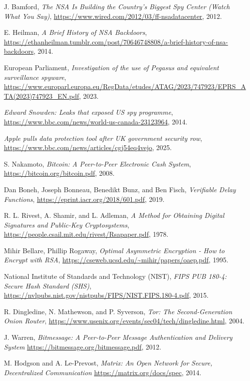 \documentclass{article}
\begin{document}
\begin{thebibliography}{10}
J. Bamford, \textit{The NSA Is Building the Country’s Biggest Spy Center (Watch What You Say)}, 
\url{https://www.wired.com/2012/03/ff-nsadatacenter}, 2012.

E. Heilman, \textit{A Brief History of NSA Backdoors}, 
\url{https://ethanheilman.tumblr.com/post/70646748808/a-brief-history-of-nsa-backdoors}, 2014.

European Parliament, \textit{Investigation of the use of Pegasus and
equivalent surveillance spyware}, 
\url{https://www.europarl.europa.eu/RegData/etudes/ATAG/2023/747923/EPRS_ATA(2023)747923_EN.pdf}, 2023.

\textit{Edward Snowden: Leaks that exposed US spy programme}, 
\url{https://www.bbc.com/news/world-us-canada-23123964}, 2014.

\textit{Apple pulls data protection tool after UK government security row}, 
\url{https://www.bbc.com/news/articles/cgj54eq4vejo}, 2025.

S. Nakamoto, \textit{Bitcoin: A Peer-to-Peer Electronic Cash System},  \url{https://bitcoin.org/bitcoin.pdf}, 2008.

Dan Boneh, Joseph Bonneau, Benedikt Bunz, and Ben Fisch, \textit{Verifiable Delay Functions},  
\url{https://eprint.iacr.org/2018/601.pdf}, 2019.

R. L. Rivest, A. Shamir, and L. Adleman, \textit{A Method for Obtaining Digital Signatures and Public-Key Cryptosystems},  
\url{https://people.csail.mit.edu/rivest/Rsapaper.pdf}, 1978.

Mihir Bellare, Phillip Rogaway, \textit{Optimal Asymmetric Encryption - How to Encrypt with RSA},  
\url{https://cseweb.ucsd.edu/~mihir/papers/oaep.pdf}, 1995.

National Institute of Standards and Technology (NIST), \textit{FIPS PUB 180-4: Secure Hash Standard (SHS)}, 
\url{https://nvlpubs.nist.gov/nistpubs/FIPS/NIST.FIPS.180-4.pdf}, 2015.

R. Dingledine, N. Mathewson, and P. Syverson, \textit{Tor: The Second-Generation Onion Router}, \url{https://www.usenix.org/events/sec04/tech/dingledine.html}, 2004.

J. Warren, \textit{Bitmessage: A Peer-to-Peer Message Authentication and Delivery System} \url{https://bitmessage.org/bitmessage.pdf}, 2012.

M. Hodgson and A. Le-Prevost, \textit{Matrix: An Open Network for Secure, Decentralized Communication} \url{https://matrix.org/docs/spec}, 2014.

\end{thebibliography}
\end{document}
